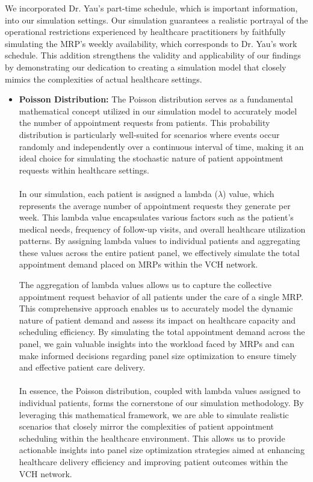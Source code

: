 \documentclass[11pt]{article}
\theoremstyle{definition}
\begin{document}
We incorporated Dr. Yau's part-time schedule, which is important information, into our simulation settings. Our simulation guarantees a realistic portrayal of the operational restrictions experienced by healthcare practitioners by faithfully simulating the MRP's weekly availability, which corresponds to Dr. Yau's work schedule. This addition strengthens the validity and applicability of our findings by demonstrating our dedication to creating a simulation model that closely mimics the complexities of actual healthcare settings.
\begin{itemize}
    \item \textbf{Poisson Distribution:} The Poisson distribution serves as a fundamental mathematical concept utilized in our simulation model to accurately model the number of appointment requests from patients. This probability distribution is particularly well-suited for scenarios where events occur randomly and independently over a continuous interval of time, making it an ideal choice for simulating the stochastic nature of patient appointment requests within healthcare settings. \\\\
    In our simulation, each patient is assigned a lambda ($\lambda$) value, which represents the average number of appointment requests they generate per week. This lambda value encapsulates various factors such as the patient's medical needs, frequency of follow-up visits, and overall healthcare utilization patterns. By assigning lambda values to individual patients and aggregating these values across the entire patient panel, we effectively simulate the total appointment demand placed on MRPs within the VCH network.
    
    The aggregation of lambda values allows us to capture the collective appointment request behavior of all patients under the care of a single MRP. This comprehensive approach enables us to accurately model the dynamic nature of patient demand and assess its impact on healthcare capacity and scheduling efficiency. By simulating the total appointment demand across the panel, we gain valuable insights into the workload faced by MRPs and can make informed decisions regarding panel size optimization to ensure timely and effective patient care delivery. \\\\
    In essence, the Poisson distribution, coupled with lambda values assigned to individual patients, forms the cornerstone of our simulation methodology. By leveraging this mathematical framework, we are able to simulate realistic scenarios that closely mirror the complexities of patient appointment scheduling within the healthcare environment. This allows us to provide actionable insights into panel size optimization strategies aimed at enhancing healthcare delivery efficiency and improving patient outcomes within the VCH network.


\end{itemize}
\end{document}
